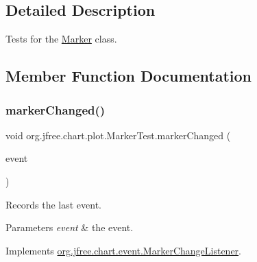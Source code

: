 \subsection{Detailed Description}
Tests for the \mbox{\hyperlink{classorg_1_1jfree_1_1chart_1_1plot_1_1_marker}{Marker}} class. 

\subsection{Member Function Documentation}
\mbox{\label{classorg_1_1jfree_1_1chart_1_1plot_1_1_marker_test_a0bc638bd786fdd5459342de17689a75e}} 
\subsubsection{\texorpdfstring{marker\+Changed()}{markerChanged()}}
{\footnotesize\ttfamily void org.\+jfree.\+chart.\+plot.\+Marker\+Test.\+marker\+Changed (\begin{DoxyParamCaption}\item[{\mbox{\hyperlink{classorg_1_1jfree_1_1chart_1_1event_1_1_marker_change_event}{Marker\+Change\+Event}}}]{event }\end{DoxyParamCaption})}

Records the last event.


\begin{DoxyParams}{Parameters}
{\em event} & the event. \\
\hline
\end{DoxyParams}


Implements \mbox{\hyperlink{interfaceorg_1_1jfree_1_1chart_1_1event_1_1_marker_change_listener_a0797552ac12ca77a9ddd96cfe5abb60e}{org.\+jfree.\+chart.\+event.\+Marker\+Change\+Listener}}.

\mbox{\label{classorg_1_1jfree_1_1chart_1_1plot_1_1_marker_test_a0a1103b817a2d48ef614d827903ac53d}} 
